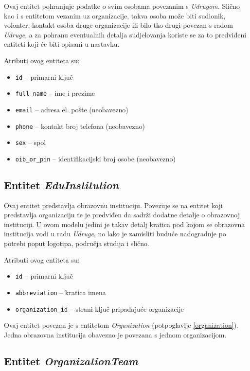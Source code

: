 \documentclass[times, utf8, diplomski]{fer}
\begin{document}
Ovaj entitet pohranjuje podatke o svim osobama povezanim s \emph{Udrugom}.
Slično kao i s entitetom vezanim uz organizacije, takva osoba može biti
sudionik, volonter, kontakt osoba druge organizacije ili bilo tko drugi povezan
s radom \emph{Udruge}, a za pohranu eventualnih detalja sudjelovanja koriste se
za to predviđeni entiteti koji će biti opisani u nastavku.

\medskip
Atributi ovog entiteta su:
\begin{itemize}
    \item \texttt{id} -- primarni ključ
    \item \texttt{full\_name} -- ime i prezime
    \item \texttt{email} -- adresa el. pošte (neobavezno)
    \item \texttt{phone} -- kontakt broj telefona (neobavezno)
    \item \texttt{sex} -- spol
    \item \texttt{oib\_or\_pin} -- identifikacijski broj osobe (neobavezno)
\end{itemize}

\subsection{Entitet \emph{EduInstitution}} \label{edu_institution}

Ovaj entitet predstavlja obrazovnu instituciju. Povezuje se na entitet koji
predstavlja organizaciju te je predviđen da sadrži dodatne detalje o obrazovnoj
instituciji. U ovom modelu jedini je takav detalj kratica pod kojom se obrazovna
institucija vodi u radu \emph{Udruge}, no lako je zamisliti buduće nadogradnje
po potrebi poput logotipa, područja studija i slično.


\medskip
Atributi ovog entiteta su:
\begin{itemize}
    \item \texttt{id} -- primarni ključ
    \item \texttt{abbreviation} -- kratica imena
    \item \texttt{organization\_id} -- strani ključ pripadajuće organizacije
\end{itemize}

Ovaj entitet povezan je s entitetom \emph{Organization} (potpoglavlje
\ref{organization}). Jedna obrazovna institucija obavezno je povezana s jednom
organizacijom.

\subsection{Entitet \emph{OrganizationTeam}} \label{organization_team}
\end{document}
